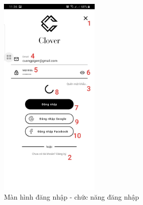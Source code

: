 \documentclass[12pt]{article}
\begin{document}
\begin{figure}[H]
    \centering
    \includegraphics[height=10cm]{images/06.png}
    \caption{Màn hình đăng nhập - chức năng đăng nhập}
\end{figure}
\end{document}
